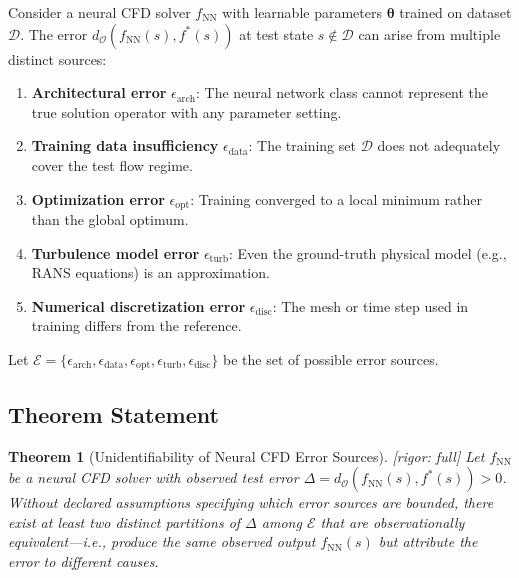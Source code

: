 \documentclass[11pt,a4paper]{article}
\newtheorem{theorem}{Theorem}[section]
\theoremstyle{definition}
\theoremstyle{remark}
\newcommand{\rigorFull}{\textcolor{green!60!black}{[rigor: full]}}
\begin{document}
Consider a neural CFD solver $f_{\text{NN}}$ with learnable parameters $\bm{\theta}$ trained on dataset $\mathcal{D}$.
The error $d_{\mathcal{O}}(f_{\text{NN}}(s), f^*(s))$ at test state $s \notin \mathcal{D}$ can arise from multiple distinct sources:

\begin{enumerate}[label=(\roman*)]
    \item \textbf{Architectural error} $\epsilon_{\text{arch}}$: The neural network class cannot represent the true solution operator with any parameter setting.
    \item \textbf{Training data insufficiency} $\epsilon_{\text{data}}$: The training set $\mathcal{D}$ does not adequately cover the test flow regime.
    \item \textbf{Optimization error} $\epsilon_{\text{opt}}$: Training converged to a local minimum rather than the global optimum.
    \item \textbf{Turbulence model error} $\epsilon_{\text{turb}}$: Even the ground-truth physical model (e.g., RANS equations) is an approximation.
    \item \textbf{Numerical discretization error} $\epsilon_{\text{disc}}$: The mesh or time step used in training differs from the reference.
\end{enumerate}

Let $\mathcal{E} = \{\epsilon_{\text{arch}}, \epsilon_{\text{data}}, \epsilon_{\text{opt}}, \epsilon_{\text{turb}}, \epsilon_{\text{disc}}\}$ be the set of possible error sources.

\subsection{Theorem Statement}

\begin{theorem}[Unidentifiability of Neural CFD Error Sources] \label{thm:unident}
\rigorFull
Let $f_{\text{NN}}$ be a neural CFD solver with observed test error $\Delta = d_{\mathcal{O}}(f_{\text{NN}}(s), f^*(s)) > 0$.
Without declared assumptions specifying which error sources are bounded, there exist at least two distinct partitions of $\Delta$ among $\mathcal{E}$ that are observationally equivalent---i.e., produce the same observed output $f_{\text{NN}}(s)$ but attribute the error to different causes.
\end{theorem}
\end{document}
